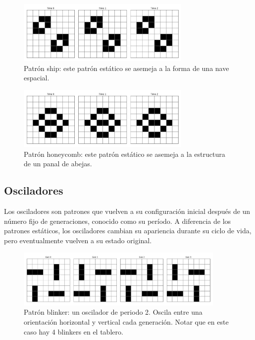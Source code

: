 \documentclass[]{article}
\begin{document}
\begin{figure}[H]
  \centering
  \includegraphics[width=0.75\textwidth]{../assets/still_life/ship/ship.png}
  \caption{Patrón ship: este patrón estático se asemeja a la forma de una nave espacial.}
  \label{fig:ship}
\end{figure}

\begin{figure}[H]
  \centering
  \includegraphics[width=0.75\textwidth]{../assets/still_life/honeycomb/honeycomb.png}
  \caption{Patrón honeycomb: este patrón estático se asemeja a la estructura de un panal de abejas.}
  \label{fig:honeycomb}
\end{figure}

\subsection{Osciladores}
Los osciladores son patrones que vuelven a su configuración inicial después de un número fijo de generaciones, conocido como su período. A diferencia de los patrones estáticos, los osciladores cambian su apariencia durante su ciclo de vida, pero eventualmente vuelven a su estado original.

\begin{figure}[H]
  \centering
  \includegraphics[width=0.9\textwidth]{../assets/oscillator/blinker/blinker.png}
  \caption{Patrón blinker: un oscilador de periodo 2. Oscila entre una orientación horizontal y vertical cada generación. Notar que en este caso hay 4 blinkers en el tablero.}
  \label{fig:blinker}
\end{figure}
\end{document}

